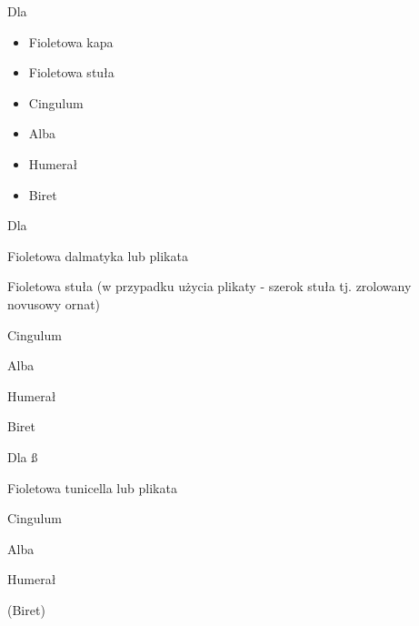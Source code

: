 \begin{paracol}{2}
	\begin{itemize*}
		\item Dla \ii
		\begin{itemize}
			\item {\color{violet} Fioletowa kapa}
			\item {\color{violet} Fioletowa stuła}
			\item Cingulum
			\item Alba
			\item Humerał
			\item Biret
		\end{itemize}
		\item Dla \dd
		\begin{itemize*}
			\item {\color{violet} Fioletowa dalmatyka lub plikata}
			\item {\color{violet} Fioletowa stuła} (w przypadku użycia
			      {\color{violet} plikaty} - szerok stuła tj. zrolowany novusowy ornat)
			\item Cingulum
			\item Alba
			\item Humerał
			\item Biret
		\end{itemize*}
		\item Dla \ss
		\begin{itemize*}
			\item {\color{violet} Fioletowa tunicella lub plikata}
			\item Cingulum
			\item Alba
			\item Humerał
			\item (Biret)
		\end{itemize*}
	\end{itemize*}

\end{paracol}